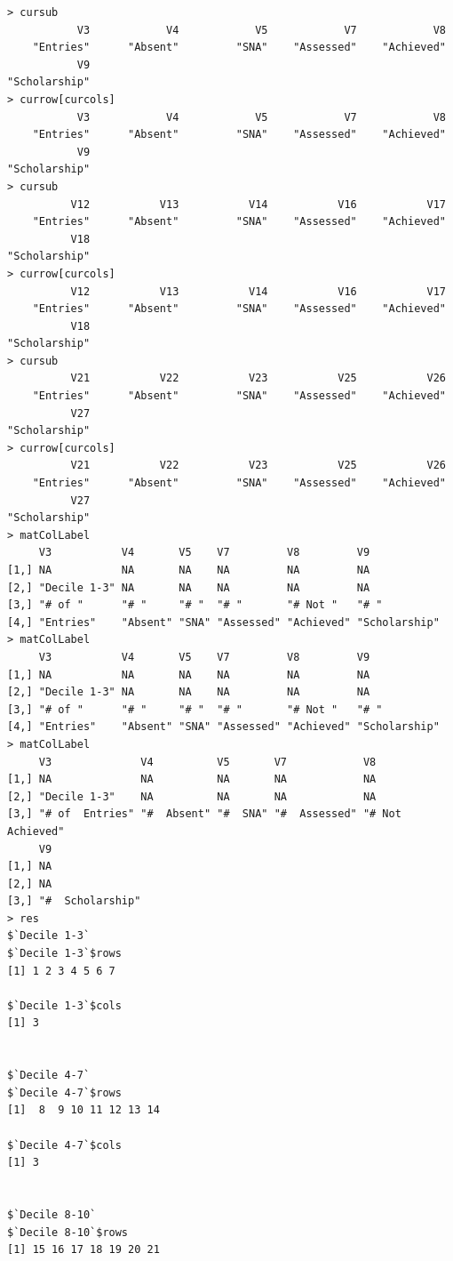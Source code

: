 \documentclass[a4paper]{article}
\begin{document}
\begin{verbatim}
> cursub 
           V3            V4            V5            V7            V8 
    "Entries"      "Absent"         "SNA"    "Assessed"    "Achieved" 
           V9 
"Scholarship" 
> currow[curcols] 
           V3            V4            V5            V7            V8 
    "Entries"      "Absent"         "SNA"    "Assessed"    "Achieved" 
           V9 
"Scholarship" 
> cursub 
          V12           V13           V14           V16           V17 
    "Entries"      "Absent"         "SNA"    "Assessed"    "Achieved" 
          V18 
"Scholarship" 
> currow[curcols] 
          V12           V13           V14           V16           V17 
    "Entries"      "Absent"         "SNA"    "Assessed"    "Achieved" 
          V18 
"Scholarship" 
> cursub 
          V21           V22           V23           V25           V26 
    "Entries"      "Absent"         "SNA"    "Assessed"    "Achieved" 
          V27 
"Scholarship" 
> currow[curcols] 
          V21           V22           V23           V25           V26 
    "Entries"      "Absent"         "SNA"    "Assessed"    "Achieved" 
          V27 
"Scholarship" 
> matColLabel 
     V3           V4       V5    V7         V8         V9           
[1,] NA           NA       NA    NA         NA         NA           
[2,] "Decile 1-3" NA       NA    NA         NA         NA           
[3,] "# of "      "# "     "# "  "# "       "# Not "   "# "         
[4,] "Entries"    "Absent" "SNA" "Assessed" "Achieved" "Scholarship"
> matColLabel 
     V3           V4       V5    V7         V8         V9           
[1,] NA           NA       NA    NA         NA         NA           
[2,] "Decile 1-3" NA       NA    NA         NA         NA           
[3,] "# of "      "# "     "# "  "# "       "# Not "   "# "         
[4,] "Entries"    "Absent" "SNA" "Assessed" "Achieved" "Scholarship"
> matColLabel 
     V3              V4          V5       V7            V8               
[1,] NA              NA          NA       NA            NA               
[2,] "Decile 1-3"    NA          NA       NA            NA               
[3,] "# of  Entries" "#  Absent" "#  SNA" "#  Assessed" "# Not  Achieved"
     V9              
[1,] NA              
[2,] NA              
[3,] "#  Scholarship"
> res 
$`Decile 1-3`
$`Decile 1-3`$rows
[1] 1 2 3 4 5 6 7

$`Decile 1-3`$cols
[1] 3


$`Decile 4-7`
$`Decile 4-7`$rows
[1]  8  9 10 11 12 13 14

$`Decile 4-7`$cols
[1] 3


$`Decile 8-10`
$`Decile 8-10`$rows
[1] 15 16 17 18 19 20 21


\end{verbatim}
\end{document}
